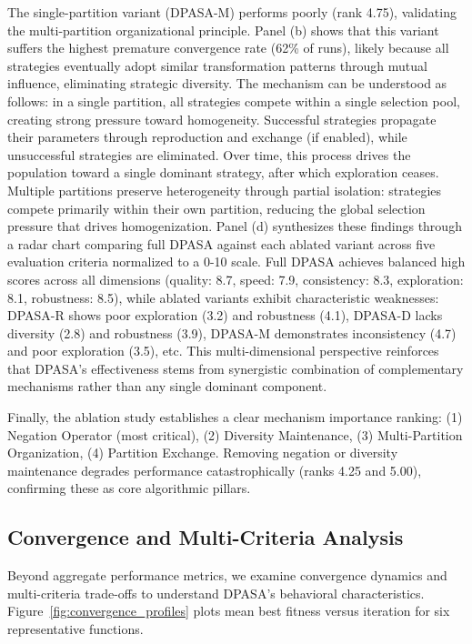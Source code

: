 \documentclass[11pt]{article}
\begin{document}
The single-partition variant (DPASA-M) performs poorly (rank 4.75), validating the multi-partition organizational principle. Panel (b) shows that this variant suffers the highest premature convergence rate (62\% of runs), likely because all strategies eventually adopt similar transformation patterns through mutual influence, eliminating strategic diversity. The mechanism can be understood as follows: in a single partition, all strategies compete within a single selection pool, creating strong pressure toward homogeneity. Successful strategies propagate their parameters through reproduction and exchange (if enabled), while unsuccessful strategies are eliminated. Over time, this process drives the population toward a single dominant strategy, after which exploration ceases. Multiple partitions preserve heterogeneity through partial isolation: strategies compete primarily within their own partition, reducing the global selection pressure that drives homogenization.
Panel (d) synthesizes these findings through a radar chart comparing full DPASA against each ablated variant across five evaluation criteria normalized to a 0-10 scale. Full DPASA achieves balanced high scores across all dimensions (quality: 8.7, speed: 7.9, consistency: 8.3, exploration: 8.1, robustness: 8.5), while ablated variants exhibit characteristic weaknesses: DPASA-R shows poor exploration (3.2) and robustness (4.1), DPASA-D lacks diversity (2.8) and robustness (3.9), DPASA-M demonstrates inconsistency (4.7) and poor exploration (3.5), etc. This multi-dimensional perspective reinforces that DPASA's effectiveness stems from synergistic combination of complementary mechanisms rather than any single dominant component.

Finally, the ablation study establishes a clear mechanism importance ranking: (1) Negation Operator (most critical), (2) Diversity Maintenance, (3) Multi-Partition Organization, (4) Partition Exchange. Removing negation or diversity maintenance degrades performance catastrophically (ranks 4.25 and 5.00), confirming these as core algorithmic pillars.

\subsection{Convergence and Multi-Criteria Analysis}
\label{sec:convergence}

Beyond aggregate performance metrics, we examine convergence dynamics and multi-criteria trade-offs to understand DPASA's behavioral characteristics. Figure~\ref{fig:convergence_profiles} plots mean best fitness versus iteration for six representative functions.
\end{document}
